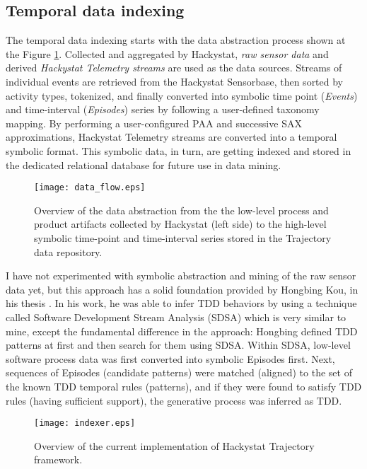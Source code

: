 \subsection{Temporal data indexing} \label{indexing}
The temporal data indexing starts with the data abstraction process shown at the Figure \ref{fig:data_flow}. Collected and aggregated by Hackystat, \textit{raw sensor data} and derived \textit{Hackystat Telemetry streams} are used as the data sources. Streams of individual events are retrieved from the Hackystat Sensorbase, then sorted by activity types, tokenized, and finally converted into symbolic time point (\textit{Events}) and time-interval (\textit{Episodes}) series by following a user-defined taxonomy mapping. By performing a user-configured PAA and successive SAX approximations, Hackystat Telemetry streams are converted into a temporal symbolic format. This symbolic data, in turn, are getting indexed and stored in the dedicated relational database for future use in data mining.

\begin{figure}[tbp]
   \centering
   \texttt{[image: data\_flow.eps]}
   \caption{Overview of the data abstraction from the the low-level process and product artifacts collected by Hackystat (left side) to the high-level symbolic time-point and time-interval series stored in the Trajectory data repository.}
   \label{fig:data_flow}
\end{figure}

I have not experimented with symbolic abstraction and mining of the raw sensor data yet, but this approach has a solid foundation provided by Hongbing Kou, in his thesis \cite{citeulike:2703162}. In his work, he was able to infer TDD behaviors by using a technique called Software Development Stream Analysis (SDSA) which is very similar to mine, except the fundamental difference in the approach: Hongbing defined TDD patterns at first and then search for them using SDSA. Within SDSA, low-level software process data was first converted into symbolic Episodes first. Next, sequences of Episodes (candidate patterns) were matched (aligned) to the set of the known TDD temporal rules (patterns), and if they were found to satisfy TDD rules (having sufficient support), the generative process was inferred as TDD.

\begin{figure}[tbp]
   \centering
   \texttt{[image: indexer.eps]}
   \caption{Overview of the current implementation of Hackystat Trajectory framework.}
   \label{fig:indexer}
\end{figure}


